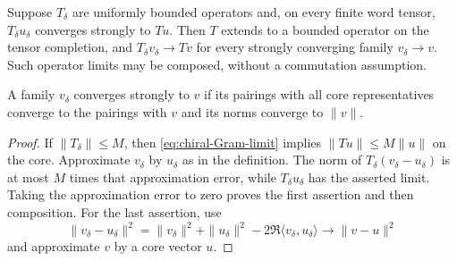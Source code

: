 \begin{lemma}\label{lem:chiral-representatives}
Suppose $T_\delta$ are uniformly bounded operators and, on every finite
word tensor, $T_\delta u_\delta$ converges strongly to $Tu$. Then $T$
extends to a bounded operator on the tensor completion, and
$T_\delta v_\delta\to Tv$ for every strongly converging family
$v_\delta\to v$. Such operator limits may be composed, without a
commutation assumption.

A family $v_\delta$ converges strongly to $v$ if its pairings with all
core representatives converge to the pairings with $v$ and its norms
converge to $\|v\|$.
\end{lemma}

\begin{proof}
If $\|T_\delta\|\le M$, then \eqref{eq:chiral-Gram-limit} implies
$\|Tu\|\le M\|u\|$ on the core. Approximate $v_\delta$ by $u_\delta$
as in the definition. The norm of
$T_\delta(v_\delta-u_\delta)$ is at most $M$ times that approximation
error, while $T_\delta u_\delta$ has the asserted limit. Taking the
approximation error to zero proves the first assertion and then composition.
For the last assertion, use
\[
 \|v_\delta-u_\delta\|^2
 =\|v_\delta\|^2+\|u_\delta\|^2
       -2\Re\langle v_\delta,u_\delta\rangle
                         \longrightarrow\|v-u\|^2
\]
and approximate $v$ by a core vector $u$.
\end{proof}

